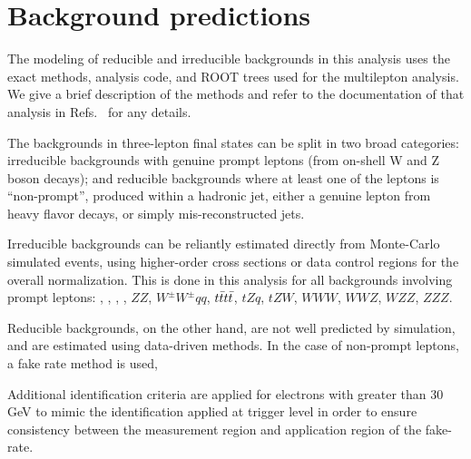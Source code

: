 \section{Background predictions}
\label{secc:bg}

The modeling of reducible and irreducible backgrounds in this analysis uses the exact methods, analysis code, and ROOT trees used for the \ttH multilepton analysis. We give a brief description of the methods and refer to the documentation of that analysis in Refs.~\cite{CMS_AN_2016-211,CMS_AN_2017-029} for any details.

The backgrounds in three-lepton final states can be split in two broad categories: irreducible backgrounds with genuine prompt leptons (\ie from on-shell W and Z boson decays); and reducible backgrounds where at least one of the leptons is ``non-prompt'', \ie produced within a hadronic jet, either a genuine lepton from heavy flavor decays, or simply mis-reconstructed jets. %

Irreducible backgrounds can be reliantly estimated directly from Monte-Carlo simulated events, using higher-order cross sections or data control regions for the overall normalization. This is done in this analysis for all backgrounds involving prompt leptons: \ttW, \ttZ, \ttH, \WZ, $ZZ$, $W^\pm W^\pm qq$, $t\bar{t}t\bar{t}$, $tZq$, $tZW$, $WWW$, $WWZ$, $WZZ$, $ZZZ$.

Reducible backgrounds, on the other hand, are not well predicted by simulation, and are estimated using data-driven methods. In the case of non-prompt leptons, a fake rate method is used,






 Additional identification criteria are applied for electrons with \pt greater than 30 GeV to mimic the identification applied at trigger level in order to ensure consistency between the measurement region and application region of the fake-rate.









